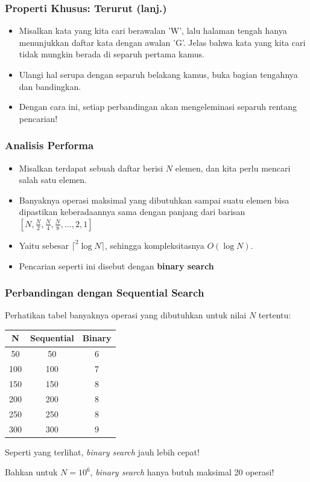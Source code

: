 \begin{frame}
\frametitle{Properti Khusus: Terurut (lanj.)}
\begin{itemize}
  \item Misalkan kata yang kita cari berawalan 'W', lalu halaman tengah hanya menunjukkan daftar kata dengan awalan 'G'. Jelas bahwa kata yang kita cari tidak mungkin berada di \alert{separuh pertama} kamus.
  \item Ulangi hal serupa dengan separuh belakang kamus, buka bagian tengahnya dan bandingkan.
  \item Dengan cara ini, setiap perbandingan akan mengeleminasi separuh rentang pencarian!
\end{itemize}
\end{frame}

\begin{frame}
\frametitle{Analisis Performa}
\begin{itemize}
  \item Misalkan terdapat sebuah daftar berisi $N$ elemen, dan kita perlu mencari salah satu elemen.
  \item Banyaknya operasi maksimal yang dibutuhkan sampai suatu elemen bisa dipastikan keberadaannya sama dengan panjang dari barisan $[N, \frac{N}{2}, \frac{N}{4}, \frac{N}{8}, ..., 2, 1]$
  \item Yaitu sebesar $\lceil ^2\log{N} \rceil$, sehingga kompleksitasnya $O(\log{N})$.
  \item Pencarian seperti ini disebut dengan \alert{\textbf{binary search}}
\end{itemize}
\end{frame}

\begin{frame}
\frametitle{Perbandingan dengan Sequential Search}
Perhatikan tabel banyaknya operasi yang dibutuhkan untuk nilai $N$ tertentu:
\begin{table}[ht]
  \begin{tabular}{|c|c|c|}
    \hline N  & Sequential  & Binary \\
    \hline 50 & 50 & 6 \\
    \hline 100 & 100 & 7 \\
    \hline 150 & 150 & 8 \\
    \hline 200 & 200 & 8 \\
    \hline 250 & 250 & 8 \\
    \hline 300 & 300 & 9 \\
    \hline
  \end{tabular}
\end{table}
Seperti yang terlihat, \textit{binary search} jauh lebih cepat!

Bahkan untuk $N = 10^6$, \textit{binary search} hanya butuh maksimal 20 operasi!
\end{frame}

